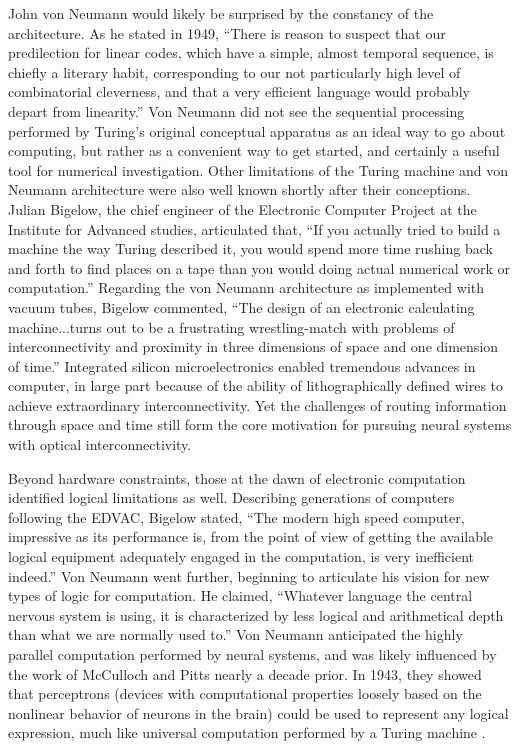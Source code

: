 John von Neumann would likely be surprised by the constancy of the architecture. As he stated in 1949, ``There is reason to suspect that our predilection for linear codes, which have a simple, almost temporal sequence, is chiefly a literary habit, corresponding to our not particularly high level of combinatorial cleverness, and that a very efficient language would probably depart from linearity.'' \cite{ne1949} Von Neumann did not see the sequential processing performed by Turing's original conceptual apparatus as an ideal way to go about computing, but rather as a convenient way to get started, and certainly a useful tool for numerical investigation. Other limitations of the Turing machine and von Neumann architecture were also well known shortly after their conceptions. Julian Bigelow, the chief engineer of the Electronic Computer Project at the Institute for Advanced studies, articulated that, ``If you actually tried to build a machine the way Turing described it, you would spend more time rushing back and forth to find places on a tape than you would doing actual numerical work or computation.'' Regarding the von Neumann architecture as implemented with vacuum tubes, Bigelow commented, ``The design of an electronic calculating machine...turns out to be a frustrating wrestling-match with problems of interconnectivity and proximity in three dimensions of space and one dimension of time.'' Integrated silicon microelectronics enabled tremendous advances in computer, in large part because of the ability of lithographically defined wires to achieve extraordinary interconnectivity. Yet the challenges of routing information through space and time still form the core motivation for pursuing neural systems with optical interconnectivity.

Beyond hardware constraints, those at the dawn of electronic computation identified logical limitations as well. Describing generations of computers following the EDVAC, Bigelow stated, ``The modern high speed computer, impressive as its performance is, from the point of view of getting the available logical equipment adequately engaged in the computation, is very inefficient indeed.'' Von Neumann went further, beginning to articulate his vision for new types of logic for computation. He claimed, ``Whatever language the central nervous system is using, it is characterized by less logical and arithmetical depth than what we are normally used to.'' \cite{ne1958} Von Neumann anticipated the highly parallel computation performed by neural systems, and was likely influenced by the work of McCulloch and Pitts nearly a decade prior. In 1943, they showed that perceptrons (devices with computational properties loosely based on the nonlinear behavior of neurons in the brain) could be used to represent any logical expression, much like universal computation performed by a Turing machine \cite{mcpi1943}. 

